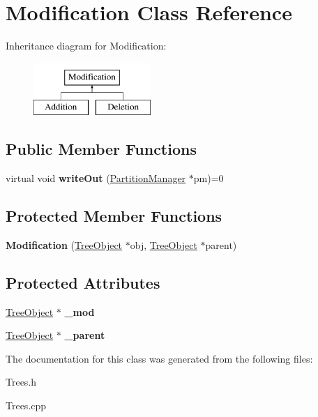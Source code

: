 \hypertarget{classModification}{}\section{Modification Class Reference}
\label{classModification}
Inheritance diagram for Modification\+:\begin{figure}[H]
\begin{center}
\leavevmode
\includegraphics[height=2.000000cm]{classModification}
\end{center}
\end{figure}
\subsection*{Public Member Functions}
\begin{DoxyCompactItemize}
\item 
\mbox{\label{classModification_a23aacec5aa5e6abfa730f7f99dc3831d}} 
virtual void {\bfseries write\+Out} (\mbox{\hyperlink{classPartitionManager}{Partition\+Manager}} $\ast$pm)=0
\end{DoxyCompactItemize}
\subsection*{Protected Member Functions}
\begin{DoxyCompactItemize}
\item 
\mbox{\label{classModification_a76407b8c6d2adb840dceea708355aba8}} 
{\bfseries Modification} (\mbox{\hyperlink{classTreeObject}{Tree\+Object}} $\ast$obj, \mbox{\hyperlink{classTreeObject}{Tree\+Object}} $\ast$parent)
\end{DoxyCompactItemize}
\subsection*{Protected Attributes}
\begin{DoxyCompactItemize}
\item 
\mbox{\label{classModification_a0aa2f9924cde904b1683f3bd80d87a02}} 
\mbox{\hyperlink{classTreeObject}{Tree\+Object}} $\ast$ {\bfseries \+\_\+mod}
\item 
\mbox{\label{classModification_a529d02be9866b96746bcae63a763f868}} 
\mbox{\hyperlink{classTreeObject}{Tree\+Object}} $\ast$ {\bfseries \+\_\+parent}
\end{DoxyCompactItemize}


The documentation for this class was generated from the following files\+:\begin{DoxyCompactItemize}
\item 
Trees.\+h\item 
Trees.\+cpp\end{DoxyCompactItemize}
